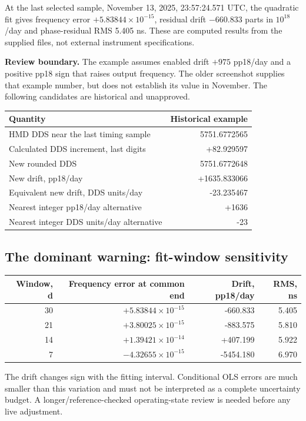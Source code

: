\documentclass[11pt,a4paper]{article}
\newcommand{\warning}[1]{\par\noindent\colorbox{light}{\parbox{\dimexpr\linewidth-2\fboxsep}{\textbf{Review boundary.} #1}}\par}
\begin{document}
At the last selected sample, November 13, 2025, 23:57:24.571 UTC, the quadratic
fit gives frequency error \(+5.83844\times10^{-15}\), residual drift
\(-660.833\) parts in \(10^{18}\)/day and phase-residual RMS 5.405 ns.
These are computed results from the supplied files, not external instrument
specifications.

\warning{The example assumes enabled drift \(+975\) pp18/day and a positive
pp18 sign that raises output frequency. The older screenshot supplies that
example number, but does not establish its value in November. The following
candidates are historical and unapproved.}

\begin{tabular}{@{}p{.49\linewidth}r@{}}
\toprule
Quantity & Historical example\\
\midrule
HMD DDS near the last timing sample & 5751.6772565\\
Calculated DDS increment, last digits & +82.929597\\
New rounded DDS & 5751.6772648\\
New drift, pp18/day & +1635.833066\\
Equivalent new drift, DDS units/day & -23.235467\\
Nearest integer pp18/day alternative & +1636\\
Nearest integer DDS units/day alternative & -23\\
\bottomrule
\end{tabular}

\subsection{The dominant warning: fit-window sensitivity}
\begin{tabular}{@{}rrrr@{}}
\toprule
Window, d & Frequency error at common end & Drift, pp18/day & RMS, ns\\
\midrule
30 & \(+5.83844\times10^{-15}\) & -660.833 & 5.405\\
21 & \(+3.80025\times10^{-15}\) & -883.575 & 5.810\\
14 & \(+1.39421\times10^{-14}\) & +407.199 & 5.922\\
7  & \(-4.32655\times10^{-15}\) & -5454.180 & 6.970\\
\bottomrule
\end{tabular}

The drift changes sign with the fitting interval. Conditional OLS errors are
much smaller than this variation and must not be interpreted as a complete
uncertainty budget. A longer/reference-checked operating-state review is
needed before any live adjustment.
\end{document}

